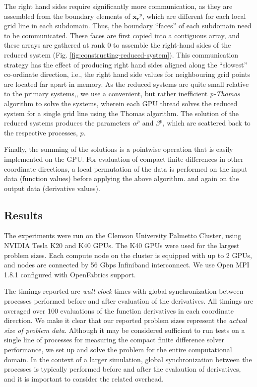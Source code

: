 \documentclass{elsarticle}
\begin{document}
The right hand sides require significantly more communication,
as they are assembled from the boundary elements of $\bm{x_r}^p$,
which are different for each local grid line in each subdomain.
Thus, the boundary ``faces'' of each subdomain need to be communicated.
These faces are first copied into a contiguous array,
and these arrays are gathered at rank 0
to assemble the right-hand sides of the reduced system
(Fig. \ref{fig:constructing-reduced-system}).
This communication strategy has the effect of
producing right hand sides aligned along the
``slowest'' co-ordinate direction, i.e.,
the right hand side values for neighbouring grid points
are located far apart in memory.
As the reduced systems are quite small relative to the primary systems,,
we use a convenient, but rather inefficient
\emph{p-Thomas} algorithm to solve the systems,
wherein each GPU thread solves the reduced system
for a single grid line using the Thomas algorithm.
The solution of the reduced systems produces the parameters
$\alpha^p$ and $\beta^p$,
which are scattered back to the respective processes, $p$.

Finally, the summing of the solutions
is a pointwise operation that is easily implemented
on the GPU.
For evaluation of compact finite differences in other
coordinate directions,
a local permutation of the data is performed on the input data
(function values)
before applying the above algorithm.
and again on the output data
(derivative values).

\subsection{Results}

The experiments were run on the
Clemson University Palmetto Cluster,
using NVIDIA Tesla K20 and K40 GPUs.
The K40 GPUs were used for the largest problem sizes.
Each compute node on the cluster is equipped with up to 2 GPUs,
and nodes are connected by 56 Gbps Infiniband interconnect.
We use Open MPI 1.8.1 configured with OpenFabrics support.

The timings reported are \emph{wall clock} times
with global synchronization between processes performed 
before and after evaluation of the derivatives.
All timings are averaged over 100 evaluations of the function derivatives
in each coordinate direction.
We make it clear that our reported
problem sizes represent the \emph{actual size of problem data}.
Although it may be considered sufficient to
run tests on a single line of processes
for measuring the compact finite difference solver performance,
we set up and solve the problem for the entire computational domain.
In the context of a larger simulation,
global synchronization between the processes
is typically performed before and after the evalaution of derivatives,
and it is important to consider the related overhead.
\end{document}
